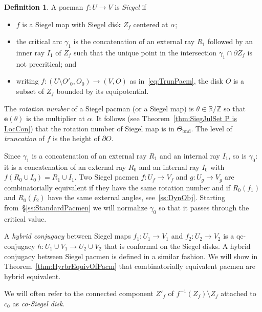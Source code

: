 \documentclass[]{amsart}
\newcommand{\ee}{\mathbf e}
\newcommand{\R}{\mathbb{R}}
\newcommand{\Z}{\mathbb{Z}}
\theoremstyle{remark}
\numberwithin{equation}{section}
\theoremstyle{definition}
\newtheorem{defn}[thm]{Definition}
\newcommand{\bnd}{{\mathrm{bnd}}}
\begin{document}
 
\begin{defn}
\label{dfn:SiegPcm}
A pacman $f:U\to V$ is \emph{Siegel} if 
\begin{itemize}
\item $f$ is a Siegel map with Siegel disk $Z_f$ centered at $\alpha$;
\item the critical arc $\gamma_1$ is the concatenation of an external ray $R_1$ followed by an inner ray $I_1$ of $Z_f$ such that the unique point in the intersection $\gamma_1\cap \partial Z_f$ is not precritical;  and
\item writing $f\colon (U\setminus O'_0, O_0)\to (V,O)$ as in~\eqref{eq:TrunPacm}, the disk  $O $ is a subset of $Z_f$ bounded by its equipotential.
\end{itemize}
\end{defn}
The \emph{rotation number} of a Siegel pacman (or a Siegel map)
 is $\theta \in \R/\Z$ so that $\ee(\theta)$ is the multiplier at $\alpha$. It follows (see Theorem~\ref{thm:SiegJulSet P is LocCon}) that the rotation number of Siegel map is in $ \Theta_\bnd$. The level of \emph{truncation} of $f$ is the height of $\partial O$.  
 
 Since $\gamma_1$ is a concatenation of an external ray $R_1$ and an internal ray $I_1$, so is $\gamma_0$: it is a concatenation of an external ray $R_0$ and an internal ray $I_0$ with $f(R_0\cup I_0)=R_1\cup I_1$. Two Siegel pacmen $f\colon U_f\to V_f$ and $g\colon U_g\to V_g$ are combinatorially equivalent if they have the same rotation number and if $R_0(f_1)$ and $R_0(f_2)$ have the same external angles, see~\eqref{ss:DynObj}. Starting from~\S\ref{ss:StandardPacmen} we will normalize $\gamma_0$ so that it passes through the critical value.
 

A \emph{hybrid conjugacy} between Siegel maps $f_1\colon U_1\to V_1$ and $f_2\colon U_2\to V_2$ is a qc-conjugacy $h\colon U_1\cup V_1\to U_2\cup V_2$ that is conformal on the Siegel disks. A hybrid conjugacy between Siegel pacmen is defined in a similar fashion.  We will show in Theorem~\ref{thm:HyrbrEquivOfPacm} that combinatorially equivalent pacmen are hybrid equivalent.



We will often refer to the connected component $Z'_f$ of $f^{-1}(Z_f)\setminus Z_f$ attached to $c_0$ as \emph{co-Siegel disk}. 
\end{document}

